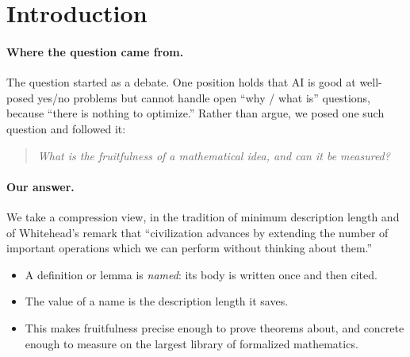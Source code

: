 \documentclass[11pt]{article}
\theoremstyle{remark}
\newcommand{\lean}[1]{\texttt{#1}}
\begin{document}
\begin{abstract}
\textbf{Measurements.}
\begin{itemize}
\item Unfolded size grows about $1.5\times$ per dependency level ($R^2=0.98$).
\item Reuse alone rediscovers the textbook core (\lean{Set}, \lean{Category},
  \lean{Functor}, \ldots).
\item Human taste splits along exactly the two factors of the exact value: concepts by
  occurrence (AUC $0.88$), famous theorems by depth (AUC $0.78$). Humans do not, however,
  value things by the product of the two (AUC $0.62$).
\item A structural glue layer takes $12\%$ of constants but $60\%$ of citations, the
  signature of function words and currency metabolites.
\end{itemize}

We correct an overreach in our own earlier statement and connect the work to proof
complexity, Gaussian elimination and renormalization, logical depth, compression
progress, and hierarchy in nature. We state open questions and falsifiable conjectures.
\end{abstract}

\section{Introduction}

\paragraph{Where the question came from.} The question started as a debate. One position
holds that AI is good at well-posed yes/no problems but cannot handle open ``why / what
is'' questions, because ``there is nothing to optimize.'' Rather than argue, we posed one
such question and followed it:

\begin{quote}\itshape
What is the fruitfulness of a mathematical idea, and can it be measured?
\end{quote}

\paragraph{Our answer.} We take a compression view, in the tradition of minimum
description length and of Whitehead's remark that ``civilization advances by extending the
number of important operations which we can perform without thinking about them.''
\begin{itemize}
\item A definition or lemma is \emph{named}: its body is written once and then cited.
\item The value of a name is the description length it saves.
\item This makes fruitfulness precise enough to prove theorems about, and concrete enough
  to measure on the largest library of formalized mathematics.
\end{itemize}
\end{document}
